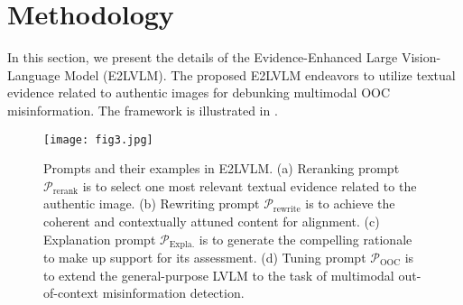 \section{Methodology}
\label{sec:Methodology}

In this section, we present the details of the Evidence-Enhanced Large Vision-Language Model (E2LVLM). The proposed E2LVLM endeavors to utilize textual evidence related to authentic images for debunking multimodal OOC misinformation. The framework is illustrated in .

\begin{figure*}
  \centering
      \texttt{[image: fig3.jpg]}
    \caption{Prompts and their examples in E2LVLM. (a) Reranking prompt $\mathcal{P}_\mathrm{rerank}$ is to select one most relevant textual evidence related to the authentic image. (b) Rewriting prompt $\mathcal{P}_\mathrm{rewrite}$ is to achieve the coherent and contextually attuned content for alignment. (c) Explanation prompt $\mathcal{P}_\mathrm{Expla.}$ is to generate the compelling rationale to make up support for its assessment. (d) Tuning prompt $\mathcal{P}_\mathrm{OOC}$ is to extend the general-purpose LVLM to the task of multimodal out-of-context misinformation detection.}
    \label{fig:3}
\end{figure*}


% 

